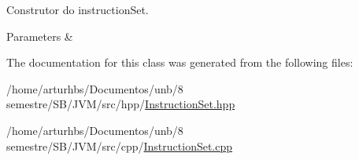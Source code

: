 Construtor do instruction\+Set. 


\begin{DoxyParams}{Parameters}
{\em } & \\
\hline
\end{DoxyParams}


The documentation for this class was generated from the following files\+:\begin{DoxyCompactItemize}
\item 
/home/arturhbs/\+Documentos/unb/8 semestre/\+S\+B/\+J\+V\+M/src/hpp/\hyperlink{InstructionSet_8hpp}{Instruction\+Set.\+hpp}\item 
/home/arturhbs/\+Documentos/unb/8 semestre/\+S\+B/\+J\+V\+M/src/cpp/\hyperlink{InstructionSet_8cpp}{Instruction\+Set.\+cpp}\end{DoxyCompactItemize}
